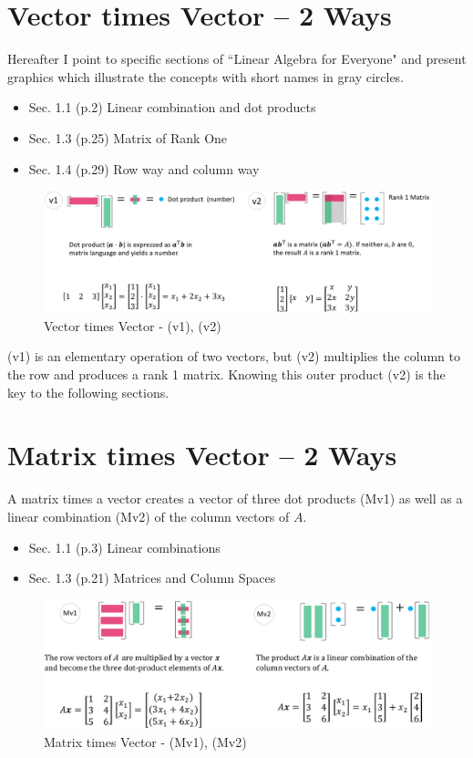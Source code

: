 \documentclass{article}
\begin{document}
\section{Vector times Vector -- 2 Ways}

Hereafter I point to specific sections of ``Linear Algebra for Everyone"
and present graphics which illustrate the concepts with short names
in gray circles.

\begin{itemize}
  \item Sec. 1.1 (p.2) Linear combination and dot products
  \item Sec. 1.3 (p.25) Matrix of Rank One
  \item Sec. 1.4 (p.29) Row way and column way
\end{itemize}

\begin{figure}[H]
  \centering
  \includegraphics[scale=0.6]{../figz/VectorTimesVector}
  \caption{Vector times Vector - (v1), (v2)}
\end{figure}

(v1) is an elementary operation of two vectors, but (v2) multiplies the column to the row
and produces a rank 1 matrix. Knowing this outer product (v2) is the key to the following sections.

\section{Matrix times Vector -- 2 Ways}

A matrix times a vector creates a vector of three dot products (Mv1)
as well as a linear combination (Mv2) of the column vectors of $A$.

\begin{itemize}
  \item Sec. 1.1 (p.3) Linear combinations
  \item Sec. 1.3 (p.21) Matrices and Column Spaces
\end{itemize}

\begin{figure}[H]
  \centering
  \includegraphics[scale=0.6]{../figz/MatrixTimesVector}
  \caption{Matrix times Vector - (Mv1), (Mv2)}
\end{figure}
\end{document}
